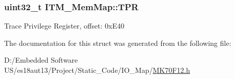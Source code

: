 \subsubsection[{T\+P\+R}]{\setlength{\rightskip}{0pt plus 5cm}uint32\+\_\+t I\+T\+M\+\_\+\+Mem\+Map\+::\+T\+P\+R}\label{struct_i_t_m___mem_map_a24ac79f5d070330282c6c0feae3cbcc1}
Trace Privilege Register, offset\+: 0x\+E40 

The documentation for this struct was generated from the following file\+:\begin{DoxyCompactItemize}
\item 
D\+:/\+Embedded Software U\+S/es18aut13/\+Project/\+Static\+\_\+\+Code/\+I\+O\+\_\+\+Map/\hyperlink{_m_k70_f12_8h}{M\+K70\+F12.\+h}\end{DoxyCompactItemize}
